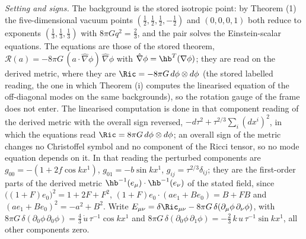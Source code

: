 \emph{Setting and signs.} The background is the stored isotropic point: by Theorem (1) the five-dimensional vacuum points $(\tfrac12, \tfrac12, \tfrac12, -\tfrac12)$ and $(0, 0, 0, 1)$ both reduce to exponents $(\tfrac13, \tfrac13, \tfrac13)$ with $8\pi G q^{2} = \tfrac23$, and the pair solves the Einstein-scalar equations. The equations are those of the stored theorem, $\mathcal{R}(a) = -8\pi G\,(a\cdot\hat\nabla\phi)\,\hat\nabla\phi$ with $\hat\nabla\phi = \hb^{T}(\nabla\phi)$; they are read on the derived metric, where they are $\Ric = -8\pi G\,d\phi\otimes d\phi$ (the stored labelled reading, the one in which Theorem (i) computes the linearised equation of the off-diagonal modes on the same backgrounds), so the rotation gauge of the frame does not enter. The linearised computation is done in that component reading of the derived metric with the overall sign reversed, $-d\tau^{2} + \tau^{2/3}\sum_{i}(dx^{i})^{2}$, in which the equations read $\Ric = 8\pi G\,d\phi\otimes d\phi$; an overall sign of the metric changes no Christoffel symbol and no component of the Ricci tensor, so no mode equation depends on it. In that reading the perturbed components are $g_{00} = -(1 + 2f\cos kx^{1})$, $g_{01} = -b\sin kx^{1}$, $g_{ij} = \tau^{2/3}\delta_{ij}$; they are the first-order parts of the derived metric $\hb^{-1}(e_{\mu})\cdot\hb^{-1}(e_{\nu})$ of the stated field, since $\bigl((1 + F)e_{0}\bigr)^{2} = 1 + 2F + F^{2}$, $(1 + F)e_{0}\cdot(ae_{1} + Be_{0}) = B + FB$ and $(ae_{1} + Be_{0})^{2} = -a^{2} + B^{2}$. Write $E_{\mu\nu} = \delta\Ric_{\mu\nu} - 8\pi G\,\delta(\partial_{\mu}\phi\,\partial_{\nu}\phi)$, with $8\pi G\,\delta(\partial_{0}\phi\,\partial_{0}\phi) = \tfrac43\,\dot u\,\tau^{-1}\cos kx^{1}$ and $8\pi G\,\delta(\partial_{0}\phi\,\partial_{1}\phi) = -\tfrac23\,k\,u\,\tau^{-1}\sin kx^{1}$, all other components zero.

